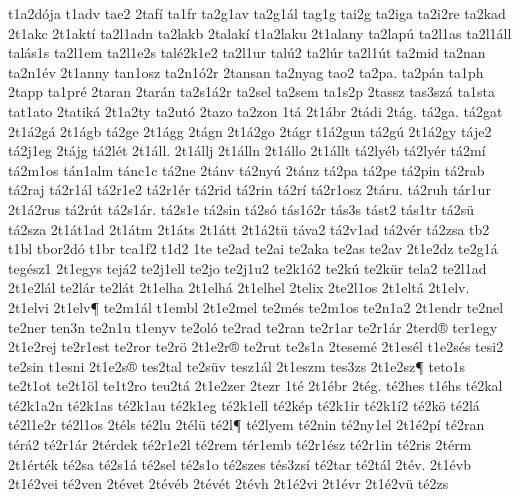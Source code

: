 {t1a2d^^f3ja
t1adv
tae2
2taf^^ed
ta1fr
ta2g1av
ta2g1^^e1l
tag1g
tai2g
ta2iga
ta2i2re
ta2kad
2t1akc
2t1akt^^ed
ta2l1adn
ta2lakb
2talak^^ed
t1a2laku
2t1alany
ta2lap^^fa
ta2l1as
ta2l1^^e1ll
tal^^e1s1s
ta2l1em
ta2l1e2s
tal^^e92k1e2
ta2l1ur
tal^^fa2
ta2l^^far
ta2l1^^fat
ta2mid
ta2nan
ta2n1^^e9v
2t1anny
tan1osz
ta2n1^^f32r
2tansan
ta2nyag
tao2
ta2pa.
ta2p^^e1n
ta1ph
2tapp
ta1pr^^e9
2taran
2tar^^e1n
ta2s1^^e12r
ta2sel
ta2sem
ta1s2p
2tassz
tas3sz^^e1
ta1sta
tat1ato
2tatik^^e1
2t1a2ty
ta2ut^^f3
2tazo
ta2zon
1t^^e1
2t1^^e1br
2t^^e1di
2t^^e1g.
t^^e12ga.
t^^e12gat
2t1^^e12g^^e1
2t1^^e1gb
t^^e12ge
2t1^^e1gg
2t^^e1gn
2t1^^e12go
2t^^e1gr
t1^^e12gun
t^^e12g^^fa
2t1^^e12gy
t^^e1je2
t^^e12j1eg
2t^^e1jg
t^^e12l^^e9t
2t1^^e1ll.
2t1^^e1llj
2t1^^e1lln
2t1^^e1llo
2t1^^e1llt
t^^e12ly^^e9b
t^^e12ly^^e9r
t^^e12m^^ed
t^^e12m1os
t^^e1n1alm
t^^e1nc1c
t^^e12ne
2t^^e1nv
t^^e12ny^^fa
2t^^e1nz
t^^e12pa
t^^e12pe
t^^e12pin
t^^e12rab
t^^e12raj
t^^e12r1^^e1l
t^^e12r1e2
t^^e12r1^^e9r
t^^e12rid
t^^e12rin
t^^e12r^^ed
t^^e12r1osz
2t^^e1ru.
t^^e12ruh
t^^e1r1ur
2t1^^e12rus
t^^e12r^^fat
t^^e12s1^^e1r.
t^^e12s1e
t^^e12sin
t^^e12s^^f3
t^^e1s1^^f32r
t^^e1s3s
t^^e1st2
t^^e1s1tr
t^^e12s^^fc
t^^e12sza
2t1^^e1t1ad
2t1^^e1tm
2t1^^e1ts
2t1^^e1tt
2t1^^e12t^^fc
t^^e1va2
t^^e12v1ad
t^^e12v^^e9r
t^^e12zsa
tb2
t1bl
tbor2d^^f3
t1br
tca1f2
t1d2
1te
te2ad
te2ai
te2aka
te2as
te2av
2t1e2dz
te2g1^^e1
teg^^e9sz1
2t1egys
tej^^e12
te2j1ell
te2jo
te2j1u2
te2k1^^f32
te2k^^fa
te2k^^fcr
tela2
te2l1ad
2t1e2l^^e1l
te2l^^e1r
te2l^^e1t
2t1elha
2t1elh^^e1
2t1elhel
2telix
2te2l1os
2t1elt^^e1
2t1elv.
2t1elvi
2t1elv^^b6
te2m1^^e1l
t1embl
2t1e2mel
te2m^^e9s
te2m1os
te2n1a2
2t1endr
te2nel
te2ner
ten3n
te2n1u
t1enyv
te2ol^^f3
te2rad
te2ran
te2r1ar
te2r1^^e1r
2terd^^ae
ter1egy
2t1e2rej
te2r1est
te2ror
te2r^^f6
2t1e2r^^ae
te2rut
te2s1a
2tesem^^e9
2t1es^^e9l
t1e2s^^e9s
tesi2
te2sin
t1esni
2t1e2s^^ae
tes2tal
te2s^^fcv
tesz1^^e1l
2t1eszm
tes3zs
2t1e2sz^^b6
teto1s
te2t1ot
te2t1^^f6l
te1t2ro
teu2t^^e1
2t1e2zer
2tezr
1t^^e9
2t1^^e9br
2t^^e9g.
t^^e92hes
t1^^e9hs
t^^e92kal
t^^e92k1a2n
t^^e92k1as
t^^e92k1au
t^^e92k1eg
t^^e92k1ell
t^^e92k^^e9p
t^^e92k1ir
t^^e92k1^^ed2
t^^e92k^^f6
t^^e92l^^e1
t^^e92l1e2r
t^^e92l1os
2t^^e9ls
t^^e92lu
2t^^e9l^^fc
t^^e92l^^b6
t^^e92lyem
t^^e92nin
t^^e92ny1el
2t1^^e92p^^ed
t^^e92ran
t^^e9r^^e12
t^^e92r1^^e1r
2t^^e9rdek
t^^e92r1e2l
t^^e92rem
t^^e9r1emb
t^^e92r1^^e9sz
t^^e92r1in
t^^e92ris
2t^^e9rm
2t1^^e9rt^^e9k
t^^e92sa
t^^e92s1^^e1
t^^e92sel
t^^e92s1o
t^^e92szes
t^^e9s3zs^^ed
t^^e92tar
t^^e92t^^e1l
2t^^e9v.
2t1^^e9vb
2t1^^e92vei
t^^e92ven
2t^^e9vet
2t^^e9v^^e9b
2t^^e9v^^e9t
2t^^e9vh
2t1^^e92vi
2t1^^e9vr
2t1^^e92v^^fc
t^^e92zs
}
